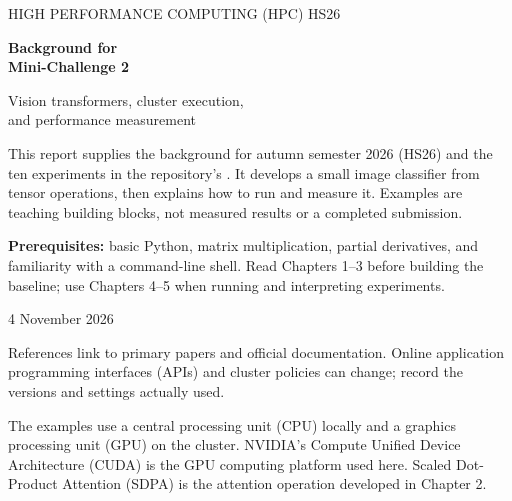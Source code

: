 \documentclass[11pt,a4paper,oneside]{report}
\newcommand{\code}[1]{\texttt{\detokenize{#1}}}
\begin{document}
\hypersetup{pageanchor=false}
\begin{titlepage}
\vspace*{22mm}
{\large\color{accent}HIGH PERFORMANCE COMPUTING (HPC) \quad HS26\par}
\vspace{12mm}
{\Huge\bfseries Background for\\[5pt]Mini-Challenge 2\par}
\vspace{9mm}
{\Large Vision transformers, cluster execution,\\and performance measurement\par}
\vspace{16mm}
This report supplies the background for autumn semester 2026 (HS26) and the ten experiments in the
repository's \code{README.md}. It develops a small image classifier from
tensor operations, then explains how to run and measure it. Examples are
teaching building blocks, not measured results or a completed submission.

\vspace{6mm}
\textbf{Prerequisites:} basic Python, matrix multiplication, partial derivatives,
and familiarity with a command-line shell. Read Chapters 1--3 before building
the baseline; use Chapters 4--5 when running and interpreting experiments.


\vfill
{\large 4 November 2026\par}
\small References link to primary papers and official documentation. Online
application programming interfaces (APIs)
and cluster policies can change; record the versions and settings actually used.
\end{titlepage}
\hypersetup{pageanchor=true}
\tableofcontents
\vspace{10mm}
The examples use a central processing unit (CPU) locally and a graphics
processing unit (GPU) on the cluster. NVIDIA's Compute Unified Device
Architecture (CUDA) is the GPU computing platform used here. Scaled
Dot-Product Attention (SDPA) is the attention operation developed in Chapter 2.
\end{document}
